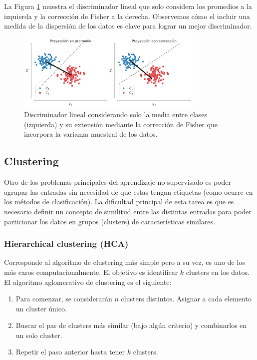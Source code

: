 La Figura \ref{fig:ej_fda} muestra el  discriminador lineal que solo considera los promedios a la  izquierda y la corrección de Fisher a la derecha. Observemos cómo el incluir una medida de la dispersión de los datos es clave para lograr un mejor discriminador.

\begin{figure}[H]
	\centering
	\includegraphics[width=0.8\textwidth]{img/cap6_dos_clases_proyeccion.pdf}
	\caption{Discriminador lineal considerando solo la media entre clases (izquierda) y  su extensión mediante la corrección de Fisher que incorpora la varianza muestral de los datos.}
	\label{fig:ej_fda}
\end{figure}

\subsection{Clustering}

Otro de los problemas principales del aprendizaje no supervisado es poder agrupar las entradas sin necesidad de que estas tengan etiquetas (como ocurre en los métodos de clasificación). La dificultad principal de esta tarea es que es necesario definir un concepto de similitud entre las distintas entradas para poder particionar los datos en grupos (clusters) de características similares.

\subsubsection{Hierarchical clustering (HCA)}

Corresponde al algoritmo de clustering más simple pero a su vez, es uno de los más caros computacionalmente. El objetivo es identificar $k$ clusters en los datos.\\

 El algoritmo aglomerativo de clustering es el siguiente:

\begin{enumerate}
	\item Para comenzar, se considerarán $n$ clusters distintos. Asignar a cada elemento un cluster único.
	\item Buscar el par de clusters más similar (bajo algún criterio) y combinarlos en un solo cluster.
	\item Repetir el paso anterior hasta tener $k$ clusters.
\end{enumerate}

